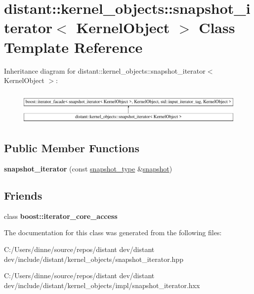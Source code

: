\hypertarget{classdistant_1_1kernel__objects_1_1snapshot__iterator}{}\section{distant\+:\+:kernel\+\_\+objects\+:\+:snapshot\+\_\+iterator$<$ Kernel\+Object $>$ Class Template Reference}
\label{classdistant_1_1kernel__objects_1_1snapshot__iterator}
Inheritance diagram for distant\+:\+:kernel\+\_\+objects\+:\+:snapshot\+\_\+iterator$<$ Kernel\+Object $>$\+:\begin{figure}[H]
\begin{center}
\leavevmode
\includegraphics[height=1.707317cm]{classdistant_1_1kernel__objects_1_1snapshot__iterator}
\end{center}
\end{figure}
\subsection*{Public Member Functions}
\begin{DoxyCompactItemize}
\item 
\mbox{\label{classdistant_1_1kernel__objects_1_1snapshot__iterator_adc4e283d1e1ea05bddcac342931baef7}} 
{\bfseries snapshot\+\_\+iterator} (const \mbox{\hyperlink{classdistant_1_1kernel__objects_1_1snapshot}{snapshot\+\_\+type}} \&\mbox{\hyperlink{classdistant_1_1kernel__objects_1_1snapshot}{snapshot}})
\end{DoxyCompactItemize}
\subsection*{Friends}
\begin{DoxyCompactItemize}
\item 
\mbox{\label{classdistant_1_1kernel__objects_1_1snapshot__iterator_ac09f73e325921cc50ebcd96bed0f8096}} 
class {\bfseries boost\+::iterator\+\_\+core\+\_\+access}
\end{DoxyCompactItemize}


The documentation for this class was generated from the following files\+:\begin{DoxyCompactItemize}
\item 
C\+:/\+Users/dinne/source/repos/distant dev/distant dev/include/distant/kernel\+\_\+objects/snapshot\+\_\+iterator.\+hpp\item 
C\+:/\+Users/dinne/source/repos/distant dev/distant dev/include/distant/kernel\+\_\+objects/impl/snapshot\+\_\+iterator.\+hxx\end{DoxyCompactItemize}
